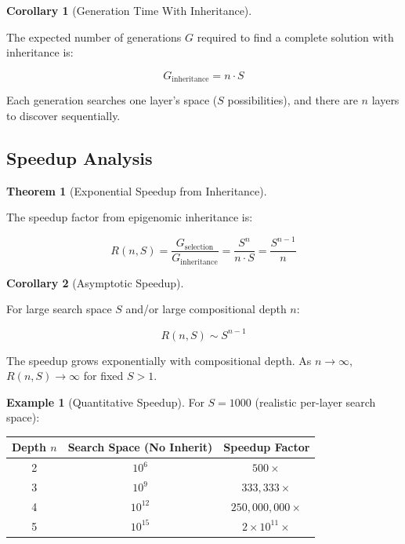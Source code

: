 \documentclass[11pt]{article}
\theoremstyle{definition}
\newtheorem{theorem}{Theorem}
\newtheorem{corollary}{Corollary}
\newtheorem{example}{Example}
\begin{document}
\begin{corollary}[Generation Time With Inheritance]
\label{cor:gen-time-inheritance}

The expected number of generations $G$ required to find a complete solution with inheritance is:

\begin{equation}
G_{\text{inheritance}} = n \cdot S
\end{equation}

Each generation searches one layer's space ($S$ possibilities), and there are $n$ layers to discover sequentially.

\end{corollary}

\subsection{Speedup Analysis}

\begin{theorem}[Exponential Speedup from Inheritance]
\label{thm:speedup}

The speedup factor from epigenomic inheritance is:

\begin{equation}
R(n, S) = \frac{G_{\text{selection}}}{G_{\text{inheritance}}} = \frac{S^n}{n \cdot S} = \frac{S^{n-1}}{n}
\end{equation}

\end{theorem}

\begin{corollary}[Asymptotic Speedup]
\label{cor:asymptotic}

For large search space $S$ and/or large compositional depth $n$:

\begin{equation}
R(n, S) \sim S^{n-1}
\end{equation}

The speedup grows exponentially with compositional depth. As $n \to \infty$, $R(n,S) \to \infty$ for fixed $S > 1$.

\end{corollary}

\begin{example}[Quantitative Speedup]
For $S = 1000$ (realistic per-layer search space):

\begin{center}
\begin{tabular}{ccc}
\toprule
Depth $n$ & Search Space (No Inherit) & Speedup Factor \\
\midrule
2 & $10^6$ & $500 \times$ \\
3 & $10^9$ & $333,333 \times$ \\
4 & $10^{12}$ & $250,000,000 \times$ \\
5 & $10^{15}$ & $2 \times 10^{11} \times$ \\
\bottomrule
\end{tabular}
\end{center}

\end{example}
\end{document}
